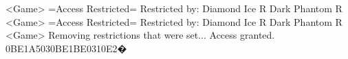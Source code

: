 <Game> =Access Restricted= 
Restricted by: Diamond Ice R Dark Phantom R 
<Game> =Access Restricted= 
Restricted by: Diamond Ice R Dark Phantom R 
<Game> Removing restrictions that were set... Access granted. 
{0B}{E1}{A5}{03}{0B}{E1}{BE}{03}{10}{E2}�
